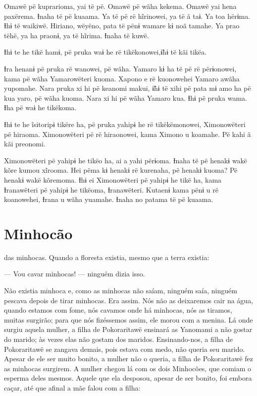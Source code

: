 Omawë pë kuprarioma, yai të pë. Omawë pë wãha kekema. Omawë yai hena
paxërema. Ɨnaha të pë kuaama. Ya të pë rë hĩrinowei, ya të ã taɨ. Ya toa
hërɨma. Ɨhɨ të waikiwë. Hiriano, wëyëno, pata të pënɨ wamare kɨ noã
tamahe. Ya prao tëhë, ya ha praonɨ, ya të hĩrima. Ɨnaha të kuwë. 

Ɨhɨ te he tikë hamɨ, pë pruka waɨ he rë tikëkonowei,ɨ̃hɨ të kãi tikëa. 

Ɨra henanɨ pë pruka rë wanowei, pë wãha. Yamaro kɨ ha të pë rë
 përɨonowei, kama pë wãha Yamarowëteri kuoma. Xapono e rë kuonowehei
 Yamaro awãha yupomahe. Nara pruka xi hi pë keanomi makui, ɨ̃hɨ të xihi pë
 pata mɨ amo ha pë kua yaro, pë wãha kuoma. Nara xi hi pë wãha Yamaro
 kua. Ɨhɨ pë pruka wama. Ɨha pë waɨ he tikëkoma. 

Ɨhɨ te he ĩsitoripɨ tikëre ha, pë pruka yahipɨ he rë tikëkëmonowei,
Ximonowëteri pë hiraoma. Ximonowëteri pë rë hiraonowei, kama Ximono u
koamahe. Pë kahi ã kãi preonomi. 

Ximonowëteri pë yahipɨ he tikëo ha, ai a yahi përɨoma. Ɨnaha të pë
henakɨ wakë kõre kumou xĩrooma. Hei pëma kɨ henakɨ rë kurenaha, pë
henakɨ kuoma? Pë henakɨ wakë kõremoma. Ɨhɨ ei Ximonowëteri pë yahipɨ he
tikë ha, kama Ɨranawëteri pë yahipɨ he tikëoma, Ɨranawëteri. Kutaenɨ
kama pënɨ u rë koanowehei, Ɨrana u wãha yuamahe. Ɨnaha no patama të pë
kuaama.

\chapter{Minhocão}
 
 das minhocas. Quando a floresta existia, mesmo que a terra
existia: 

--- Vou cavar minhocas! --- ninguém dizia isso. 

Não existia minhoca e, como as minhocas não saíam, ninguém saía, ninguém
pescava depois de tirar minhocas. Era assim. Nós não as deixaremos cair
na água, quando estamos com fome, nós cavamos onde há minhocas, nós as
tiramos, muitas surgirão; para que nós fizéssemos assim, ele morou com a
menina. Lá onde surgiu aquela mulher, a filha de Pokoraritawë ensinará
as Yanomami a não gostar do marido;  às vezes elas não gostam dos maridos. Ensinando-nos, a filha de Pokoraritawë se zangava demais, pois
estava com medo, não queria seu marido. Apesar de ele ser muito bonito,
a mulher não o queria, a filha de Pokoraritawë fez as minhocas surgirem.
A mulher chegou lá com os dois Minhocões, que comiam o esperma deles
mesmos. Aquele que ela desposou, apesar de ser bonito, foi embora caçar,
até que afinal a mãe falou com a filha: 

